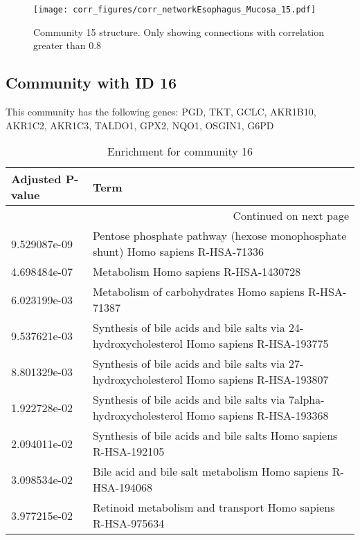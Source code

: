 \begin{figure}[h!]
\centering
\texttt{[image: corr\_figures/corr\_networkEsophagus\_Mucosa\_15.pdf]}
\caption{Community 15 structure. Only showing connections with correlation greater than 0.8}
\end{figure}




\subsection*{Community with ID 16}
This community has the following genes: PGD, TKT, GCLC, AKR1B10, AKR1C2, AKR1C3, TALDO1, GPX2, NQO1, OSGIN1, G6PD
\\
\begin{longtable}{p{2.4cm}p{14.5cm}}
\caption{Enrichment for community 16}\\
\toprule
Adjusted \newline P-value &                                                                                            Term \\
\midrule
\endhead
\midrule
\multicolumn{2}{r}{{Continued on next page}} \\
\midrule
\endfoot

\bottomrule
\endlastfoot
             9.529087e-09 &                 Pentose phosphate pathway (hexose monophosphate shunt) Homo sapiens R-HSA-71336 \\
             4.698484e-07 &                                                           Metabolism Homo sapiens R-HSA-1430728 \\
             6.023199e-03 &                                            Metabolism of carbohydrates Homo sapiens R-HSA-71387 \\
             9.537621e-03 &      Synthesis of bile acids and bile salts via 24-hydroxycholesterol Homo sapiens R-HSA-193775 \\
             8.801329e-03 &      Synthesis of bile acids and bile salts via 27-hydroxycholesterol Homo sapiens R-HSA-193807 \\
             1.922728e-02 &  Synthesis of bile acids and bile salts via 7alpha-hydroxycholesterol Homo sapiens R-HSA-193368 \\
             2.094011e-02 &                                Synthesis of bile acids and bile salts Homo sapiens R-HSA-192105 \\
             3.098534e-02 &                                    Bile acid and bile salt metabolism Homo sapiens R-HSA-194068 \\
             3.977215e-02 &                                     Retinoid metabolism and transport Homo sapiens R-HSA-975634 \\
\end{longtable}


